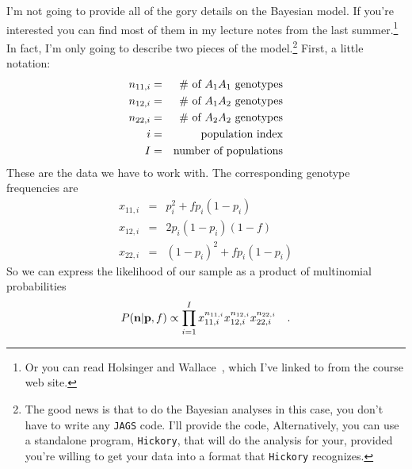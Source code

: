 I'm not going to provide all of the gory details on the Bayesian
model. If you're interested you can find most of them in my lecture
notes from the 
last summer.\footnote{Or you can read Holsinger and
  Wallace~\cite{Holsinger-Wallace-2004}, which I've linked to from the
  course web site.} In fact, I'm only going to describe two pieces of
the model.\footnote{The good news is that to do the Bayesian analyses
  in this case, you don't have to write any {\tt JAGS} code. I'll
  provide the code, Alternatively, you can use a standalone program,
  {\tt Hickory}, that will do the analysis for your, provided you're
  willing to get your data into a format that {\tt Hickory}
  recognizes.} First, a little notation:
\begin{eqnarray*}
n_{11,i} &=& \hbox{\# of $A_1A_1$ genotypes} \\
n_{12,i} &=& \hbox{\# of $A_1A_2$ genotypes} \\
n_{22,i} &=& \hbox{\# of $A_2A_2$ genotypes} \\
i         &=& \hbox{population index} \\
I         &=& \hbox{number of populations} \\
\end{eqnarray*}
These are the data we have to work with. The corresponding genotype
frequencies are
\begin{eqnarray*}
x_{11,i} &=& p_{i}^2 + fp_{i}(1-p_{i}) \\
x_{12,i} &=& 2p_{i}(1-p_{i})(1-f) \\
x_{22,i} &=& (1-p_{i})^2 + fp_{i}(1-p_{i})
\end{eqnarray*}
So we can express the likelihood of our sample as a product of
multinomial probabilities
\[
P({\bf n}|{\bf p},f) \propto \prod_{i=1}^I x_{11,i}^{n_{11,i}}
x_{12,i}^{n_{12,i}} x_{22,i}^{n_{22,i}} \quad .
\]

